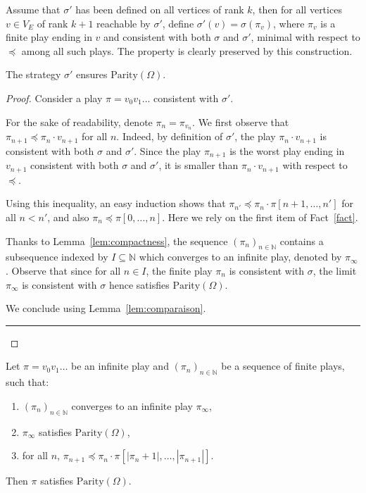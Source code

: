 \documentclass[11pt]{llncs}
\newcommand{\N}{\mathbb{N}}
\newcommand{\VE}{V_{E}}
\newcommand{\Parity}{\mathrm{Parity}}
\newcommand{\nN}{_{n \in \N}}
\def\qed{\rule{0.4em}{1.4ex}}
\begin{document}
Assume that $\sigma'$ has been defined on all vertices of rank $k$,
then for all vertices $v \in \VE$ of rank $k+1$ reachable by $\sigma'$,
define $\sigma'(v) = \sigma(\pi_v)$,
where $\pi_v$ is a finite play ending in $v$ and consistent with both $\sigma$ and $\sigma'$,
minimal with respect to $\preceq$ among all such plays.
The property is clearly preserved by this construction.

\begin{theorem}
The strategy $\sigma'$ ensures $\Parity(\Omega)$.
\end{theorem}

\begin{proof}
Consider a play $\pi = v_0 v_1 \ldots$ consistent with $\sigma'$.

For the sake of readability, denote $\pi_n = \pi_{v_n}$.
We first observe that $\pi_{n+1} \preceq \pi_n \cdot v_{n+1}$ for all $n$.
Indeed, by definition of $\sigma'$, the play $\pi_n \cdot v_{n+1}$ is consistent with both $\sigma$ and $\sigma'$.
Since the play $\pi_{n+1}$ is the worst play ending in $v_{n+1}$ consistent with both $\sigma$
and $\sigma'$, it is smaller than $\pi_n \cdot v_{n+1}$ with respect to $\preceq$.

Using this inequality, an easy induction shows that $\pi_{n'} \preceq \pi_n \cdot \pi[n+1,\ldots,n']$
for all $n < n'$, and also $\pi_n \preceq \pi[0,\ldots,n]$. 
Here we rely on the first item of Fact~\ref{fact}.

Thanks to Lemma~\ref{lem:compactness},
the sequence $(\pi_n)\nN$ contains a subsequence indexed by $I \subseteq \N$
which converges to an infinite play, denoted by $\pi_\infty$.
Observe that since for all $n \in I$, the finite play $\pi_n$ is consistent with $\sigma$,
the limit $\pi_\infty$ is consistent with $\sigma$ hence satisfies $\Parity(\Omega)$.

We conclude using Lemma~\ref{lem:comparaison}.
\hfill\qed
\end{proof}

\begin{lemma}\label{lem:comparaison}
Let $\pi = v_0 v_1 \ldots$ be an infinite play and $(\pi_n)\nN$ be a sequence of finite plays, such that:
\begin{enumerate}
	\item $(\pi_n)\nN$ converges to an infinite play $\pi_\infty$,
	\item $\pi_\infty$ satisfies $\Parity(\Omega)$,
	\item for all $n$, $\pi_{n+1} \preceq \pi_n \cdot \pi[|\pi_n+1|,\ldots,|\pi_{n+1}|]$.
\end{enumerate}
Then $\pi$ satisfies $\Parity(\Omega)$.
\end{lemma}
\end{document}
